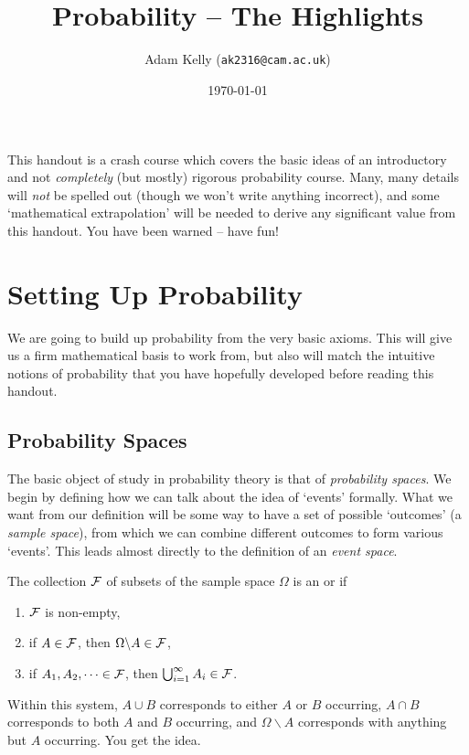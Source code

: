 \documentclass[10pt, a4paper]{article}
\title{\vspace{-3\baselineskip}\ \\Probability -- The Highlights}
\author{Adam Kelly (\texttt{ak2316@cam.ac.uk})}
\date{\today}
\begin{document}
\maketitle


This handout is a crash course which covers the basic ideas of an introductory and not \emph{completely} (but mostly) rigorous probability course. 
Many, many details will \emph{not} be spelled out (though we won't write anything incorrect), and some `mathematical extrapolation' will be needed to derive any significant value from this handout. You have been warned -- have fun!

\section{Setting Up Probability}

We are going to build up probability from the very basic axioms. This will give us a firm mathematical basis to work from, but also will match the intuitive notions of probability that you have hopefully developed before reading this handout.

\subsection{Probability Spaces}

The basic object of study in probability theory is that of \emph{probability spaces}. We begin by defining how we can talk about the idea of `events' formally. What we want from our definition will be some way to have a set of possible `outcomes' (a \emph{sample space}), from which we can combine different outcomes to form various `events'. This leads almost directly to the definition of an \emph{event space}.

\begin{definition} The collection $\mathcal{F}$ of subsets of the sample space $\Omega$ is an  or  if
	\begin{enumerate}
		\item $\mathcal{F}$ is non-empty,
		\item if $A \in \mathcal{F}$, then $\Omega \backslash A \in \mathcal{F}$,
		\item if $A_1, A_2, \dots \in \mathcal{F}$, then $\bigcup_{i = 1}^{\infty} A_i \in \mathcal{F}$.
	\end{enumerate}
\end{definition}

Within this system, $A \cup B$ corresponds to either $A$ or $B$ occurring, $A \cap B$ corresponds to both $A$ and $B$ occurring, and $\Omega \backslash A$ corresponds with anything but $A$ occurring. You get the idea.
\end{document}

